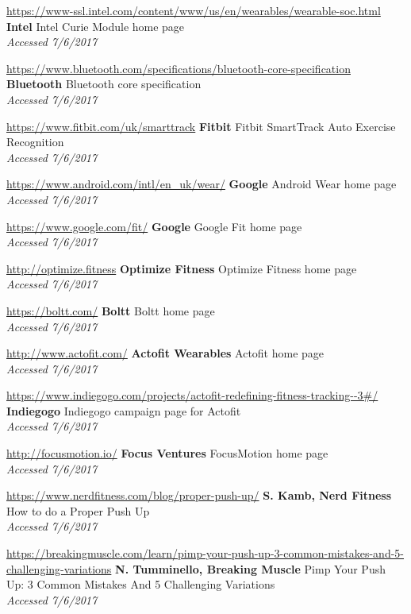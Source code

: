 \documentclass[a4paper]{article}
\begin{document}
\begin{thebibliography}{9}
\url{https://www-ssl.intel.com/content/www/us/en/wearables/wearable-soc.html}
\textbf{Intel}
Intel Curie Module home page
\\\textit{Accessed 7/6/2017}

\url{https://www.bluetooth.com/specifications/bluetooth-core-specification}
\textbf{Bluetooth}
Bluetooth core specification
\\\textit{Accessed 7/6/2017}

\url{https://www.fitbit.com/uk/smarttrack}
\textbf{Fitbit}
Fitbit SmartTrack Auto Exercise Recognition
\\\textit{Accessed 7/6/2017}

\url{https://www.android.com/intl/en_uk/wear/}
\textbf{Google}
Android Wear home page
\\\textit{Accessed 7/6/2017}

\url{https://www.google.com/fit/}
\textbf{Google}
Google Fit home page
\\\textit{Accessed 7/6/2017}

\url{http://optimize.fitness}
\textbf{Optimize Fitness}
Optimize Fitness home page
\\\textit{Accessed 7/6/2017}

\url{https://boltt.com/}
\textbf{Boltt}
Boltt home page
\\\textit{Accessed 7/6/2017}

\url{http://www.actofit.com/}
\textbf{Actofit Wearables}
Actofit home page
\\\textit{Accessed 7/6/2017}

\url{https://www.indiegogo.com/projects/actofit-redefining-fitness-tracking--3#/}
\textbf{Indiegogo}
Indiegogo campaign page for Actofit
\\\textit{Accessed 7/6/2017}

\url{http://focusmotion.io/}
\textbf{Focus Ventures}
FocusMotion home page
\\\textit{Accessed 7/6/2017}

\url{https://www.nerdfitness.com/blog/proper-push-up/}
\textbf{S. Kamb, Nerd Fitness}
How to do a Proper Push Up
\\\textit{Accessed 7/6/2017}

\url{https://breakingmuscle.com/learn/pimp-your-push-up-3-common-mistakes-and-5-challenging-variations}
\textbf{N. Tumminello, Breaking Muscle}
Pimp Your Push Up: 3 Common Mistakes And 5 Challenging Variations
\\\textit{Accessed 7/6/2017}


\end{thebibliography}
\end{document}
